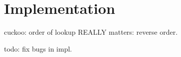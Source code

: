 \section{Implementation}

cuckoo:
order of lookup REALLY matters: reverse order.

todo: fix bugs in impl.
